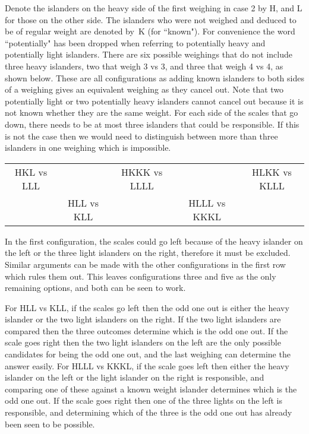Denote the islanders on the heavy side of the first weighing in case 2 by H, and L for those on the other side. The islanders who were not weighed and deduced to be of regular weight are denoted by~K (for ``known"). For convenience the word ``potentially" has been dropped when referring to potentially heavy and potentially light islanders. There are six possible weighings that do not include three heavy islanders, two that weigh 3 vs 3, and three that weigh 4 vs 4, as shown below. These are all configurations as adding known islanders to both sides of a weighing gives an equivalent weighing as they cancel out. Note that two potentially light or two potentially heavy islanders cannot cancel out because it is not known whether they are the same weight. For each side of the scales that go down, there needs to be at most three islanders that could be responsible. If this is not the case then we would need to distinguish between more than three islanders in one weighing which is impossible.

\begin{table}[H]
    \centering
    \begin{tabular}{ccccc}
        HKL vs LLL & & HKKK vs LLLL & & HLKK vs KLLL\vspace{4mm}  \\
        & HLL vs KLL & & HLLL vs KKKL
    \end{tabular}
\end{table}

In the first configuration, the scales could go left because of the heavy islander on the left or the three light islanders on the right, therefore it must be excluded. Similar arguments can be made with the other configurations in the first row which rules them out. This leaves configurations three and five as the only remaining options, and both can be seen to work.

For HLL vs KLL, if the scales go left then the odd one out is either the heavy islander or the two light islanders on the right. If the two light islanders are compared then the three outcomes determine which is the odd one out. If the scale goes right then the two light islanders on the left are the only possible candidates for being the odd one out, and the last weighing can determine the answer easily. For HLLL vs KKKL, if the scale goes left then either the heavy islander on the left or the light islander on the right is responsible, and comparing one of these against a known weight islander determines which is the odd one out. If the scale goes right then one of the three lights on the left is responsible, and determining which of the three is the odd one out has already been seen to be possible.

